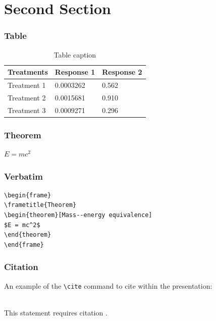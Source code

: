 \documentclass[aspectratio=169]{beamer}
\begin{document}
\section{Second Section}

\begin{frame}
\frametitle{Table}
\begin{table}
\begin{tabular}{l l l}
\toprule
\textbf{Treatments} & \textbf{Response 1} & \textbf{Response 2}\\
\midrule
Treatment 1 & 0.0003262 & 0.562 \\
Treatment 2 & 0.0015681 & 0.910 \\
Treatment 3 & 0.0009271 & 0.296 \\
\bottomrule
\end{tabular}
\caption{Table caption}
\end{table}
\end{frame}


\begin{frame}
\frametitle{Theorem}
\begin{theorem}
$E = mc^2$
\end{theorem}
\end{frame}


\begin{frame}[fragile] %
\frametitle{Verbatim}
\begin{example}
\begin{verbatim}
\begin{frame}
\frametitle{Theorem}
\begin{theorem}[Mass--energy equivalence]
$E = mc^2$
\end{theorem}
\end{frame}\end{verbatim}
\end{example}
\end{frame}


\begin{frame}[fragile] %
\frametitle{Citation}
An example of the \verb|\cite| command to cite within the presentation:\\~

This statement requires citation \cite{p1}.
\end{frame}
\end{document}
